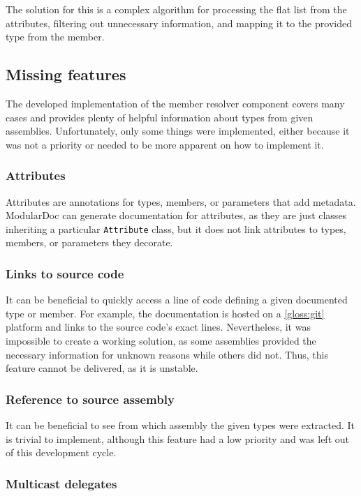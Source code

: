The solution for this is a complex algorithm for processing the flat list from the attributes, filtering out unnecessary information, and mapping it to the provided type from the member.

\subsection{Missing features}

The developed implementation of the member resolver component covers many cases and provides plenty of helpful information about types from given assemblies. Unfortunately, only some things were implemented, either because it was not a priority or needed to be more apparent on how to implement it.

\subsubsection{Attributes}

Attributes are annotations for types, members, or parameters that add metadata. ModularDoc can generate documentation for attributes, as they are just classes inheriting a particular \lstinline[language=csh]{Attribute} class, but it does not link attributes to types, members, or parameters they decorate.

\subsubsection{Links to source code}

It can be beneficial to quickly access a line of code defining a given documented type or member. For example, the documentation is hosted on a \ref{gloss:git} platform and links to the source code's exact lines. Nevertheless, it was impossible to create a working solution,
as some assemblies provided the necessary information for unknown reasons while others did not. Thus, this feature cannot be delivered, as it is unstable.

\subsubsection{Reference to source assembly}

It can be beneficial to see from which assembly the given types were extracted. It is trivial to implement, although this feature had a low priority and was left out of this development cycle.

\subsubsection{Multicast delegates}


